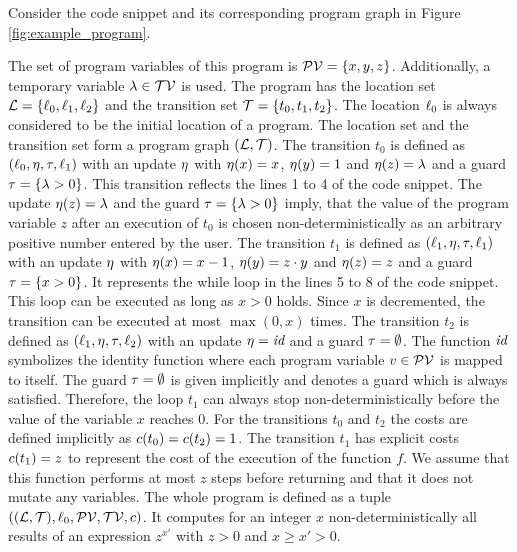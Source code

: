 \begin{example}[Program]
  Consider the code snippet and its corresponding program graph in Figure \ref{fig:example_program}.
  
  The set of program variables of this program is $\mathcal{PV} = \lbrace x,y,z \rbrace$.
  Additionally, a temporary variable $\lambda \in \mathcal{TV}$ is used.
  The program has the location set $\mathcal{L} = \lbrace \ell_0,\ell_1,\ell_2 \rbrace$ and the transition set $\mathcal{T} = \lbrace t_0,t_1,t_2 \rbrace$.
  The location $\ell_0$ is always considered to be the initial location of a program.
  The location set and the transition set form a program graph $(\mathcal{L}, \mathcal{T})$.
  The transition $t_0$ is defined as $(\ell_0,\eta,\tau,\ell_1)$ with an update $\eta$ with $\eta(x)=x$, $\eta(y)=1$ and $\eta(z)=\lambda$ and a guard $\tau = \lbrace \lambda > 0 \rbrace$.
  This transition reflects the lines 1 to 4 of the code snippet.
  The update $\eta(z)=\lambda$ and the guard $\tau = \lbrace \lambda > 0 \rbrace$ imply, that the value of the program variable $z$ after an execution of $t_0$ is chosen non-deterministically as an arbitrary positive number entered by the user.
  The transition $t_1$ is defined as $(\ell_1,\eta,\tau,\ell_1)$ with an update $\eta$ with $\eta(x)=x-1$, $\eta(y)=z \cdot y$ and $\eta(z)=z$ and a guard $\tau = \lbrace x > 0 \rbrace$.
  It represents the while loop in the lines 5 to 8 of the code snippet.
  This loop can be executed as long as $x > 0$ holds.
  Since $x$ is decremented, the transition can be executed at most $\max(0,x)$ times.
  The transition $t_2$ is defined as $(\ell_1,\eta,\tau,\ell_2)$ with an update $\eta = \emph{id}$ and a guard $\tau = \emptyset$.
  The function $\emph{id}$ symbolizes the identity function where each program variable $v \in \mathcal{PV}$ is mapped to itself.
  The guard $\tau = \emptyset$ is given implicitly and denotes a guard which is always satisfied.
  Therefore, the loop $t_1$ can always stop non-deterministically before the value of the variable $x$ reaches $0$.
  For the transitions $t_0$ and $t_2$ the costs are defined implicitly as $c(t_0) = c(t_2) = 1$.
  The transition $t_1$ has explicit costs $c(t_1) = z$ to represent the cost of the execution of the function $f$.
  We assume that this function performs at most $z$ steps before returning and that it does not mutate any variables.
  The whole program is defined as a tuple $((\mathcal{L}, \mathcal{T}), \ell_0, \mathcal{PV}, \mathcal{TV}, c)$.
  It computes for an integer $x$ non-deterministically all results of an expression $z^{x'}$ with $z > 0$ and $x \geq x' > 0$.  
\end{example}

